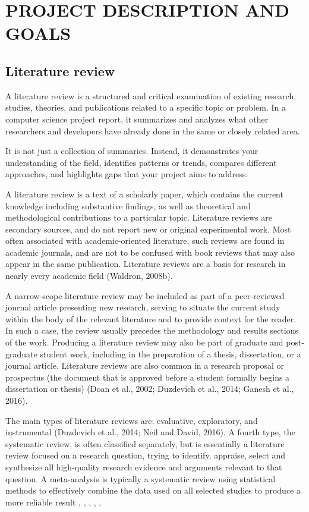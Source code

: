 \chapter{\MakeUppercase{Project Description and Goals}}
\label{chap:project-description}
\section{Literature review}
\label{sec:literature-review}
A literature review is a structured and critical examination of existing research, studies, theories, and publications related to a specific topic or problem. In a computer science project report, it summarizes and analyzes what other researchers and developers have already done in the same or closely related area.

It is not just a collection of summaries. Instead, it demonstrates your understanding of the field, identifies patterns or trends, compares different approaches, and highlights gaps that your project aims to address.

A literature review is a text of a scholarly paper, which contains the current knowledge including substantive findings, as well as theoretical and methodological contributions to a particular topic. Literature reviews are secondary sources, and do not report new or 
original experimental work. Most often associated with  academic-oriented literature, such reviews are found in academic journals, and are not to be confused with book reviews that may also appear in the same publication. Literature reviews are a basis for research in nearly every academic field (Waldron, 2008b). 

A narrow-scope literature review may be included as part of a peer-reviewed journal article  presenting new research, serving to situate the current study within the body of the relevant 
literature and to provide context for the reader. In such a case, the review usually precedes the methodology and results sections of the work. Producing a literature review may also be part of graduate and post-graduate student work, including in the preparation of a thesis, 
dissertation, or a journal article. Literature reviews are also common in a research proposal or prospectus (the document that is approved before a student formally begins a dissertation or thesis) (Doan et al., 2002; Duzdevich et al., 2014; Ganesh et al., 2016).

The main types of literature reviews are: evaluative, exploratory, and instrumental (Duzdevich et al., 2014; Neil and David, 2016). 
A fourth type, the systematic review, is often classified separately, but is essentially a literature review focused on a research question, trying to identify, appraise, select and synthesize all high-quality research evidence and arguments relevant to that question. A meta-analysis is typically a systematic review using statistical methods to effectively 
combine the data used on all selected studies to produce a more reliable result \cite{duzdevich2014dna}, \cite{mohanaprasad2017optimized}, \cite{gilbarg1977elliptic}, \cite{haykin2004kalman}, \cite{haykin2005cognitive}, \cite{knuth1986computers}

